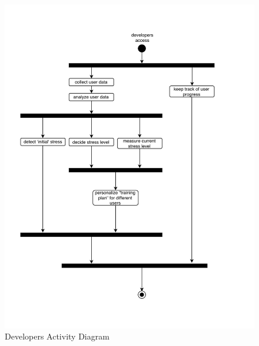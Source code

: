 \begin{figure}[!ht]
    \centering
    \includegraphics[width=\linewidth]{activity-diagram-developers}
    \caption{Developers Activity Diagram}
    \label{fig:act-div-dev}
\end{figure}